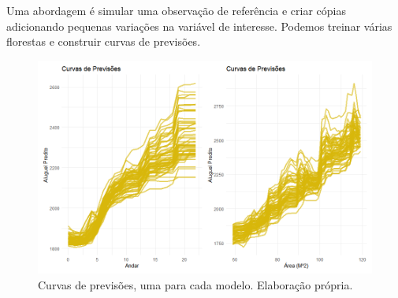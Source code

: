 \documentclass{beamer} %
\newcommand{\1}{\mathbb{I}}
\begin{document}
\begin{frame}
Uma abordagem é simular uma observação de referência e criar cópias adicionando pequenas variações na variável de interesse. Podemos treinar várias florestas e construir curvas de previsões. 

\begin{figure}[H]
    \centering
    \includegraphics[scale = .25]{imagens/curvas_previsoes_rf.png}
    \caption{Curvas de previsões, uma para cada modelo. Elaboração própria.}
\end{figure}

\end{frame}







\begin{frame}

\end{frame}
\end{document}
